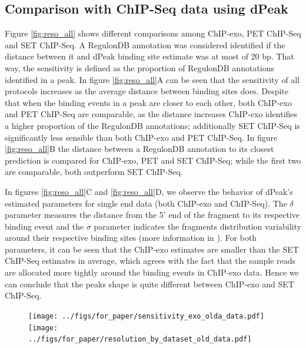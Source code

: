 \documentclass[11pt]{article}\usepackage[]{graphicx}\usepackage[]{color}
\begin{document}
\subsection{Comparison with ChIP-Seq data using dPeak}
\label{sec:dpeak_analysis}




Figure \ref{fig:reso_all} shows different comparisons among ChIP-exo,
PET ChIP-Seq and SET ChIP-Seq. A RegulonDB annotation was considered
identified if the distance between it and dPeak binding site estimate
was at most of 20 bp. That way, the sensitivity is defined as
the proportion of RegulonDB annotations identified in a peak. In
figure \ref{fig:reso_all}A can be seen that the sensitivity of all
protocols increases as the average distance between binding sites
does. Despite that when the binding events in a peak are closer to
each other, both ChIP-exo and PET ChIP-Seq are comparable, as the
distance increases ChIP-exo identifies a higher proportion of the
RegulonDB annotations; additionally SET ChIP-Seq is significantly less
sensible than both ChIP-exo and PET ChIP-Seq. In figure
\ref{fig:reso_all}B the distance between a RegulonDB annotation to its
closest prediction is compared for ChIP-exo, PET and SET ChIP-Seq;
while the first two are comparable, both outperform SET ChIP-Seq.

In figures \ref{fig:reso_all}C and \ref{fig:reso_all}D, we observe the
behavior of dPeak's estimated parameters for single end data (both
ChIP-exo and ChIP-Seq). The $\delta$ parameter measures the distance
from the 5' end of the fragment to its respective binding event and
the $\sigma$ parameter indicates the fragments distribution
variability around their respective binding sites (more information in
\cite{dpeak}). For both parameters, it can be seen that the ChIP-exo
estimates are smaller than the SET ChIP-Seq estimates in average,
which agrees with the fact that the sample reads are allocated more
tightly around the binding events in ChIP-exo data. Hence we can
conclude that the peaks shape is quite different between ChIP-exo and
SET ChIP-Seq.


\begin{figure}[H]
  \centering
  \texttt{[image: ../figs/for\_paper/sensitivity\_exo\_olda\_data.pdf]}
  \texttt{[image: ../figs/for\_paper/resolution\_by\_dataset\_old\_data.pdf]}
\end{figure}
\end{document}
